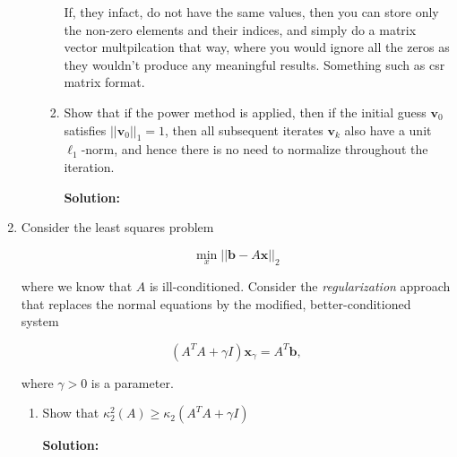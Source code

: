 \documentclass[12pt]{article}
\newcommand{\norm}[1]{\left|\left| #1 \right|\right|}
\begin{document}
\begin{enumerate}
\begin{enumerate}
\begin{enumerate}
    If, they infact, do not have the same values, then you can store only the non-zero elements and their
    indices, and simply do a matrix vector multpilcation that way, where you would ignore all the zeros as
    they wouldn't produce any meaningful results. Something such as {\sc csr} matrix format.

    \item Show that if the power method is applied, then if the initial guess $\mathbf{v}_{0}$
    satisfies $\norm{\mathbf{v}_{0}}_{1} = 1$, then all subsequent iterates $\mathbf{v}_{k}$
    also have a unit $\ell_{1}$-norm, and hence there is no need to normalize throughout the iteration.

    {\bf Solution:}

  \end{enumerate}
\end{enumerate}

\item Consider the least squares problem

\[
\min_{x} \norm{\mathbf{b} - A\mathbf{x}}_{2}
\]

where we know that $A$ is ill-conditioned. Consider the {\em regularization} approach
that replaces the normal equations by the modified, better-conditioned system

\[
\left( A^{T}A + \gamma I\right)\mathbf{x}_{\gamma} = A^{T}\mathbf{b},
\]

where $\gamma > 0$ is a parameter.

\begin{enumerate}
  \item Show that $\kappa_{2}^{2}(A) \geq \kappa_{2}\left( A^{T}A + \gamma I \right)$

  {\bf Solution:}


\end{enumerate}
\end{enumerate}
\end{document}
